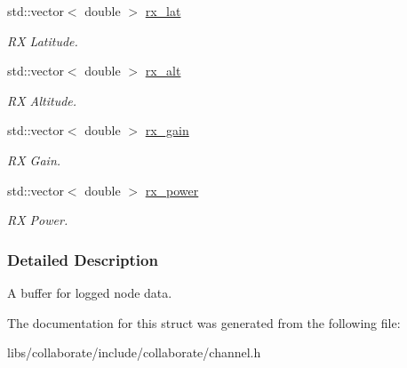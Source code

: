 \begin{DoxyCompactItemize}
std\+::vector$<$ double $>$ \hyperlink{structosse_1_1collaborate_1_1_channel_1_1_log_buffer_ad9d1672a8d8e78078d1b06efbe135668}{rx\+\_\+lat}
\begin{DoxyCompactList}\small\item\em RX Latitude. \end{DoxyCompactList}\item 
\mbox{\label{structosse_1_1collaborate_1_1_channel_1_1_log_buffer_acda4e7cac97825af0b1c0a273caa542f}} 
std\+::vector$<$ double $>$ \hyperlink{structosse_1_1collaborate_1_1_channel_1_1_log_buffer_acda4e7cac97825af0b1c0a273caa542f}{rx\+\_\+alt}
\begin{DoxyCompactList}\small\item\em RX Altitude. \end{DoxyCompactList}\item 
\mbox{\label{structosse_1_1collaborate_1_1_channel_1_1_log_buffer_a4a1fe81a56f14fae41aac661a68e25f9}} 
std\+::vector$<$ double $>$ \hyperlink{structosse_1_1collaborate_1_1_channel_1_1_log_buffer_a4a1fe81a56f14fae41aac661a68e25f9}{rx\+\_\+gain}
\begin{DoxyCompactList}\small\item\em RX Gain. \end{DoxyCompactList}\item 
\mbox{\label{structosse_1_1collaborate_1_1_channel_1_1_log_buffer_a8d643b5e82bf2993297601be7d99e57f}} 
std\+::vector$<$ double $>$ \hyperlink{structosse_1_1collaborate_1_1_channel_1_1_log_buffer_a8d643b5e82bf2993297601be7d99e57f}{rx\+\_\+power}
\begin{DoxyCompactList}\small\item\em RX Power. \end{DoxyCompactList}\end{DoxyCompactItemize}


\subsubsection{Detailed Description}
A buffer for logged node data. 

The documentation for this struct was generated from the following file\+:\begin{DoxyCompactItemize}
\item 
libs/collaborate/include/collaborate/channel.\+h\end{DoxyCompactItemize}
